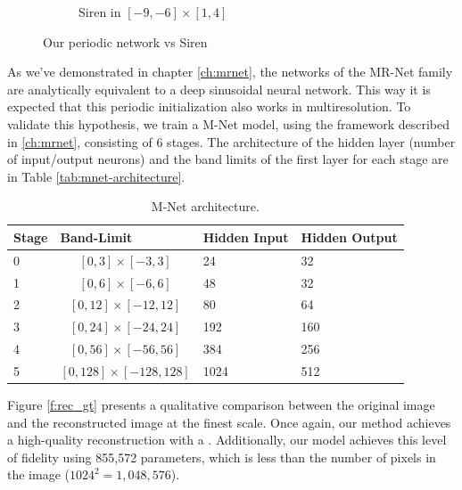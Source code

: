 \begin{figure}
\begin{subfigure}[b]{0.24\textwidth}
        \caption{Siren in $[-9, -6] \times [1, 4]$}
        \label{f:siren-leopard-translated}
    \end{subfigure}
       \caption{Our periodic network vs Siren}
       \label{f:comparison-siren}
\end{figure}

As we've demonstrated in chapter \ref{ch:mrnet}, the networks of the MR-Net family are analytically equivalent to a deep sinusoidal neural network. This way it is expected that this periodic initialization also works in multiresolution. To validate this hypothesis, we train a M-Net model, using the framework described in \ref{ch:mrnet}, consisting of $6$ stages. The architecture of the hidden layer (number of input/output neurons) and the band limits of the first layer for each stage are in Table \ref{tab:mnet-architecture}.

\begin{table}[h]
\small
\begin{tabular}{|l|c|l|l|}
\hline
\textbf{Stage} & \multicolumn{1}{l|}{\textbf{Band-Limit}} & \multicolumn{1}{l|}{\textbf{Hidden Input}} & \multicolumn{1}{l|}{\textbf{Hidden Output}} \\ \hline
 0     & $[0, 3]\times[-3, 3]$                       & 24                                & 32                                 \\
 1     & $[0, 6]\times[-6, 6]$                       & 48                                & 32                                 \\
 2     & $[0, 12]\times[-12, 12]$                     & 80                                & 64                                 \\
 3     & $[0, 24]\times[-24, 24]$                     & 192                               & 160                                \\
 4     & $[0, 56]\times[-56, 56]$                     & 384                               & 256                                \\
 5     & $[0, 128]\times[-128, 128]$                   & 1024                              & 512                                \\ \hline
\end{tabular}
\caption{M-Net architecture.}
\end{table}\label{tab:mnet-architecture}


Figure \ref{f:rec_gt} presents a qualitative comparison between the original image and the reconstructed image at the finest scale. Once again, our method achieves a high-quality reconstruction with a . Additionally, our model achieves this level of fidelity using 855,572 parameters, which is less than the number of pixels in the image ($1024^2 = 1,048,576$). 

